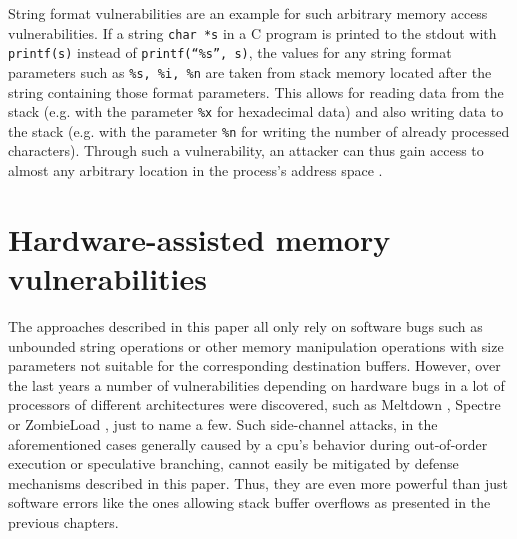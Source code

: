 String format vulnerabilities are an example for such arbitrary memory access vulnerabilities.
If a string \texttt{char *s} in a C program is printed to the \gls{stdout} with \texttt{printf(s)} instead of \texttt{printf(``\%s'', s)}, the values for any string format parameters such as \texttt{\%s, \%i, \%n} are taken from stack memory located after the string containing those format parameters.
This allows for reading data from the stack (e.g. with the parameter \texttt{\%x} for hexadecimal data) and also writing data to the stack (e.g. with the parameter \texttt{\%n} for writing the number of already processed characters).
Through such a vulnerability, an attacker can thus gain access to almost any arbitrary location in the process's address space \cite{scut2001}.

\section{Hardware-assisted memory vulnerabilities}
\label{sec:hardware-assisted-memory-vulnerabilities}

The approaches described in this paper all only rely on software bugs such as unbounded string operations or other memory manipulation operations with size parameters not suitable for the corresponding destination buffers.
However, over the last years a number of vulnerabilities depending on hardware bugs in a lot of processors of different architectures were discovered, such as Meltdown \cite{Lipp2018}, Spectre \cite{Kocher2019} or ZombieLoad \cite{Schwarz2019}, just to name a few.
Such side-channel attacks, in the aforementioned cases generally caused by a \gls{cpu}'s behavior during out-of-order execution or speculative branching, cannot easily be mitigated by defense mechanisms described in this paper.
Thus, they are even more powerful than just software errors like the ones allowing stack buffer overflows as presented in the previous chapters.
